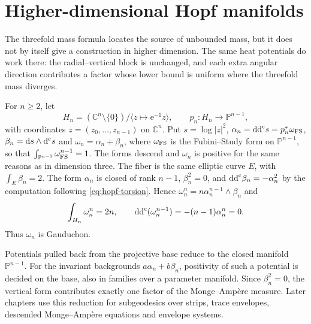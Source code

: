 \section{Higher-dimensional Hopf manifolds}
\label{sec:hopf-all-dimensions}

The threefold mass formula locates the source of unbounded mass, but it does not by itself give a construction in higher dimension. The same heat potentials do work there: the radial--vertical block is unchanged, and each extra angular direction contributes a factor whose lower bound is uniform where the threefold mass diverges.

For $n\geq2$, let
\[
 H_n=(\mathbb C^n\setminus\{0\})/
             \langle z\mapsto\mathrm e^{-1}z\rangle,
 \qquad p_n\colon H_n\longrightarrow\mathbb P^{n-1},
\]
with coordinates $z=(z_0,\dots,z_{n-1})$ on $\mathbb C^n$.
Put $s=\log|z|^2$, $\alpha_n=\mathrm{dd}^{\mathrm{c}} s=p_n^*\omega_{\mathrm{FS}}$,
$\beta_n=\mathrm ds\wedge\mathrm d^{\mathrm c} s$ and $\omega_n=\alpha_n+\beta_n$, where
$\omega_{\mathrm{FS}}$ is the Fubini--Study form on $\mathbb P^{n-1}$, so that
$\int_{\mathbb P^{n-1}}\omega_{\mathrm{FS}}^{n-1}=1$.
The forms descend and $\omega_n$ is positive for the same reasons as in dimension three. The fiber is the same elliptic curve $E$, with $\int_E\beta_n=2$. The form $\alpha_n$ is closed of rank $n-1$, $\beta_n^2=0$, and $\mathrm{dd}^{\mathrm{c}}\beta_n=-\alpha_n^2$ by the computation following \eqref{eq:hopf-torsion}. Hence $\omega_n^n=n\alpha_n^{n-1}\wedge\beta_n$ and
\[
 \int_{H_n}\omega_n^n=2n,\qquad
 \mathrm{dd}^{\mathrm{c}}(\omega_n^{n-1})=-(n-1)\alpha_n^n=0.
\]
Thus $\omega_n$ is Gauduchon.

Potentials pulled back from the projective base reduce to the closed manifold $\mathbb P^{n-1}$. For the invariant backgrounds $a\alpha_n+b\beta_n$, positivity of such a potential is decided on the base, also in families over a parameter manifold. Since $\beta_n^2=0$, the vertical form contributes exactly one factor of the Monge--Amp\`ere measure. Later chapters use this reduction for subgeodesics over strips, trace envelopes, descended Monge--Amp\`ere equations and envelope systems.

